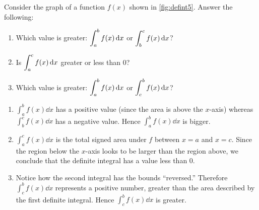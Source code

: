 \begin{example}\label{ex_defint5}%
Consider the graph of a function $f(x)$ shown in \autoref{fig:defint5}. Answer the following:
%
%
\begin{enumerate}
	\item	Which value is greater: $\displaystyle \int_a^b f(x)\operatorname{d}\! x$ or $\displaystyle \int_b^c f(x)\operatorname{d}\! x$?
	\item	Is $\displaystyle \int_a^c f(x)\operatorname{d}\! x$ greater or less than 0?
	\item	Which value is greater: $\displaystyle \int_a^b f(x)\operatorname{d}\! x$ or $\displaystyle \int_c^b f(x)\operatorname{d}\! x$?
\end{enumerate}
\solution
\begin{enumerate}
	\item	$\int_a^b f(x)\dd x$ has a positive value (since the area is above the $x$-axis) whereas $\int_b^c f(x)\dd x$ has a negative value. Hence $\int_a^b f(x)\dd x$ is bigger.
	\item	$\int_a^c f(x)\dd x$ is the total signed area under $f$ between $x=a$ and $x=c$. Since the region below the $x$-axis looks to be larger than the region above, we conclude that the definite integral has a value less than 0.
	\item	Notice how the second integral has the bounds ``reversed.'' Therefore $\int_c^b f(x)\dd x$ represents a positive number, greater than the area described by the first definite integral. Hence $\int_c^b f(x)\dd x$ is greater.
\end{enumerate}
\end{example}

